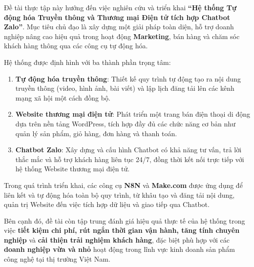 \begin{tomluoc}
Đề tài thực tập này hướng đến việc nghiên cứu và triển khai 
\textbf{``Hệ thống Tự động hóa Truyền thông và Thương mại Điện tử tích hợp Chatbot Zalo''}. 
Mục tiêu chủ đạo là xây dựng một giải pháp toàn diện, hỗ trợ doanh nghiệp nâng cao hiệu quả trong 
hoạt động \textbf{Marketing}, bán hàng và chăm sóc khách hàng thông qua các công cụ tự động hóa.  

Hệ thống được định hình với ba thành phần trọng tâm:  

\begin{enumerate}
    \item \textbf{Tự động hóa truyền thông}: Thiết kế quy trình tự động tạo ra nội dung truyền thông 
    (video, hình ảnh, bài viết) và lập lịch đăng tải lên các kênh mạng xã hội một cách đồng bộ.
    
    \item \textbf{Website thương mại điện tử}: Phát triển một trang bán điện thoại di động dựa trên 
    nền tảng WordPress, tích hợp đầy đủ các chức năng cơ bản như quản lý sản phẩm, giỏ hàng, đơn hàng 
    và thanh toán.
    
    \item \textbf{Chatbot Zalo}: Xây dựng và cấu hình Chatbot có khả năng tư vấn, trả lời thắc mắc và 
    hỗ trợ khách hàng liên tục 24/7, đồng thời kết nối trực tiếp với hệ thống Website thương mại điện tử.
\end{enumerate}

Trong quá trình triển khai, các công cụ \textbf{N8N} và \textbf{Make.com} được ứng dụng để liên kết và 
tự động hóa toàn bộ quy trình, từ khâu tạo và đăng tải nội dung, quản trị Website đến việc tích hợp dữ liệu 
và giao tiếp qua Chatbot.  

Bên cạnh đó, đề tài còn tập trung đánh giá hiệu quả thực tế của hệ thống trong việc 
\textbf{tiết kiệm chi phí, rút ngắn thời gian vận hành, tăng tính chuyên nghiệp} và 
\textbf{cải thiện trải nghiệm khách hàng}, đặc biệt phù hợp với các \textbf{doanh nghiệp vừa và nhỏ} 
hoạt động trong lĩnh vực kinh doanh sản phẩm công nghệ tại thị trường Việt Nam.  

\end{tomluoc}